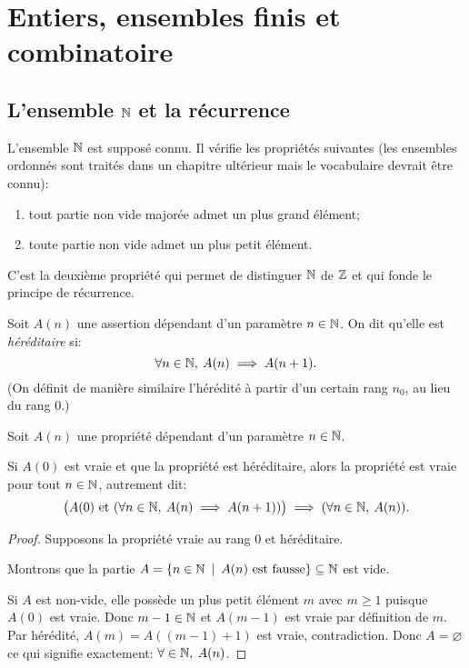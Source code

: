\chapter{Entiers, ensembles finis et combinatoire}
\minitoc
\hyperlink{toc}{\retourTOC}

\section{L'ensemble $\N$ et la récurrence}
\index{$\N$}

L'ensemble $\N$ est supposé connu. Il vérifie les propriétés suivantes (les ensembles ordonnés sont traités dans un chapitre ultérieur mais le vocabulaire devrait être connu):
\begin{enumerate}
\item tout partie non vide majorée admet un plus grand élément;
\item toute partie non vide admet un plus petit élément.
\end{enumerate}

C'est la deuxième propriété qui permet de distinguer $\N$ de $\mathbb{Z}$ et qui fonde le principe de récurrence.


\begin{definition}
Soit $A(n)$ une assertion dépendant d'un paramètre $n\in \mathbb{N}$. 
On dit qu'elle est \emph{héréditaire} si:
\[
\forall n\in \mathbb{N},\: A(n)\implies A(n+1).
\]
(On définit de manière similaire l'hérédité à partir d'un certain rang $n_0$, au lieu du rang $0$.)
\end{definition}

\begin{theoreme}
Soit $A(n)$ une propriété dépendant d'un paramètre $n\in \mathbb{N}$. 

Si $A(0)$ est vraie et que la propriété est héréditaire, alors la propriété est vraie pour tout $n\in\mathbb{N}$, autrement dit:
\[
\big( A(0) \text{ et }(\forall n\in \mathbb{N},\: A(n)\implies A(n+1))\big) \implies (\forall n\in \mathbb{N}, \: A(n)).
\]
\end{theoreme}
\begin{proof}Supposons la propriété vraie au rang $0$ et héréditaire.

Montrons que la partie $A = \{n\in \mathbb{N}\:\mid\: A(n)\text{ est fausse}\} \subseteq \mathbb{N}$ est vide.

Si $A$ est non-vide, elle possède un plus petit élément $m$ avec $m\geq 1$ puisque $A(0)$ est vraie. Donc $m-1 \in \mathbb{N}$ et $A(m-1)$ est vraie par définition de $m$. Par hérédité, $A(m)=A((m-1)+1)$ est vraie, contradiction. Donc $A=\varnothing$ ce qui signifie exactement: $\forall \in\mathbb{N},\:A(n)$.
\end{proof}

